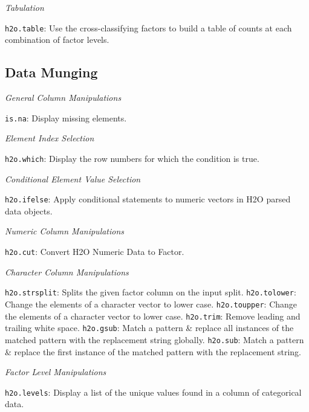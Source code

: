 {{\emph{Tabulation}\par
{\texttt{h2o.table}}: Use the cross-classifying factors to build a table of counts at each combination of factor levels.

\subsection{Data Munging}\par

\emph{General Column Manipulations}\par
{\texttt{is.na}}: Display missing elements.  \newline

\emph{Element Index Selection}\par 
{\texttt{h2o.which}}: Display the row numbers for which the condition is true.\newline

\emph{Conditional Element Value Selection}\par 
{\texttt{h2o.ifelse}}: Apply conditional statements to numeric vectors in H2O parsed data objects.\newline

\emph{Numeric Column Manipulations}\par
{\texttt{h2o.cut}}: Convert H2O Numeric Data to Factor. \newline

\emph{Character Column Manipulations}\par
{\texttt{h2o.strsplit}}: Splits the given factor column on the input split. \newline
{\texttt{h2o.tolower}}: Change the elements of a character vector to lower case. \newline
{\texttt{h2o.toupper}}: Change the elements of a character vector to lower case. \newline
{\texttt{h2o.trim}}: Remove leading and trailing white space.\newline
{\texttt{h2o.gsub}}: Match a pattern \& replace all instances of the matched pattern with the replacement string globally. \newline
{\texttt{h2o.sub}}: Match a pattern \& replace the first instance of the matched pattern with the replacement string.\newline

\emph{Factor Level Manipulations}\par
{\texttt{h2o.levels}}: Display a list of the unique values found in a column of categorical data. \newline

}}
